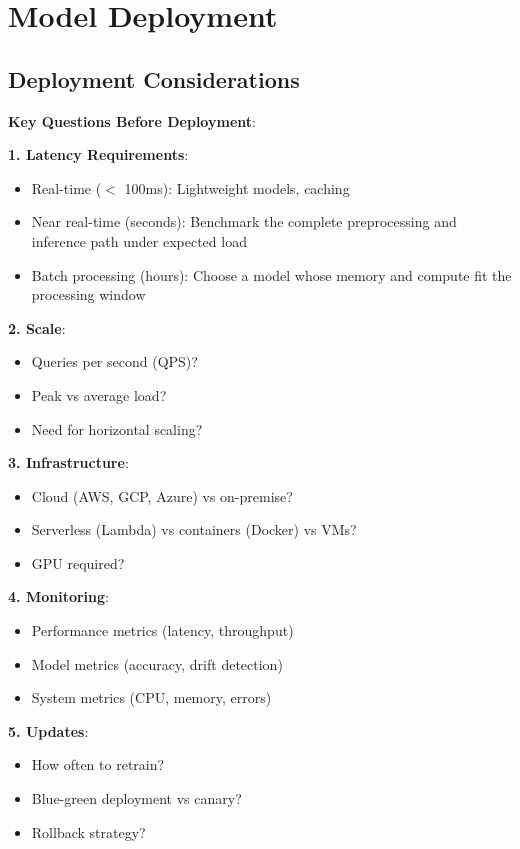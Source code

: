 \documentclass[11pt,twoside]{article}
\numberwithin{equation}{section}
\theoremstyle{plain}
\theoremstyle{definition}
\theoremstyle{remark}
\newenvironment{keyidea}{
  \begin{tcolorbox}[colback=yellow!5!white,
                    colframe=yellow!50!black,
                    title=Key Idea,
                    breakable,
                    enhanced,
                    sharp corners,
                    boxrule=0.8pt,
                    left=6pt, right=6pt, top=6pt, bottom=6pt]
}{
  \end{tcolorbox}
}
\begin{document}
\section{Model Deployment}
\label{sec:deployment}

\subsection{Deployment Considerations}

\begin{keyidea}
\textbf{Key Questions Before Deployment}:

\textbf{1. Latency Requirements}:
\begin{itemize}
\item Real-time ($<$ 100ms): Lightweight models, caching
\item Near real-time (seconds): Benchmark the complete preprocessing and inference path under expected load
\item Batch processing (hours): Choose a model whose memory and compute fit the processing window
\end{itemize}

\textbf{2. Scale}:
\begin{itemize}
\item Queries per second (QPS)?
\item Peak vs average load?
\item Need for horizontal scaling?
\end{itemize}

\textbf{3. Infrastructure}:
\begin{itemize}
\item Cloud (AWS, GCP, Azure) vs on-premise?
\item Serverless (Lambda) vs containers (Docker) vs VMs?
\item GPU required?
\end{itemize}

\textbf{4. Monitoring}:
\begin{itemize}
\item Performance metrics (latency, throughput)
\item Model metrics (accuracy, drift detection)
\item System metrics (CPU, memory, errors)
\end{itemize}

\textbf{5. Updates}:
\begin{itemize}
\item How often to retrain?
\item Blue-green deployment vs canary?
\item Rollback strategy?
\end{itemize}
\end{keyidea}
\end{document}
